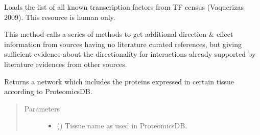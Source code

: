 \documentclass[letterpaper,10pt,english]{sphinxmanual}
\begin{document}
\begin{fulllineitems}
\begin{fulllineitems}
\label{\detokenize{main:pypath.main.PyPath.table_latex}}
\end{fulllineitems}


\begin{fulllineitems}
\label{\detokenize{main:pypath.main.PyPath.tfs_list}}
Loads the list of all known transcription factors from TF census
(Vaquerizas 2009). This resource is human only.

\end{fulllineitems}


\begin{fulllineitems}
\label{\detokenize{main:pypath.main.PyPath.third_source_directions}}
This method calls a series of methods to get
additional direction \& effect information
from sources having no literature curated references,
but giving sufficient evidence about the directionality
for interactions already supported by literature
evidences from other sources.

\end{fulllineitems}


\begin{fulllineitems}
\label{\detokenize{main:pypath.main.PyPath.tissue_network}}
Returns a network which includes the proteins expressed in
certain tissue according to ProteomicsDB.
\begin{quote}\begin{description}
\item[{Parameters}] \leavevmode\begin{itemize}
\item {} 
 () \textendash{} Tissue name as used in ProteomicsDB.


\end{itemize}
\end{description}
\end{quote}
\end{fulllineitems}
\end{fulllineitems}
\end{document}
